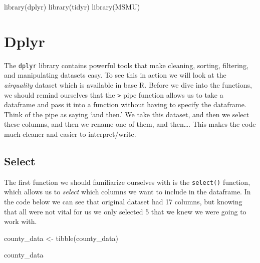 \documentclass[
  letterpaper,
  DIV=11,
  numbers=noendperiod]{scrreprt}
\newenvironment{Shaded}{\begin{snugshade}}{\end{snugshade}}
\newcommand{\FunctionTok}[1]{\textcolor[rgb]{0.28,0.35,0.67}{#1}}
\newcommand{\NormalTok}[1]{\textcolor[rgb]{0.00,0.23,0.31}{#1}}
\newcommand{\OtherTok}[1]{\textcolor[rgb]{0.00,0.23,0.31}{#1}}
\begin{document}
\begin{Shaded}
\begin{Highlighting}[]
\FunctionTok{library}\NormalTok{(dplyr)}
\FunctionTok{library}\NormalTok{(tidyr)}
\FunctionTok{library}\NormalTok{(MSMU)}
\end{Highlighting}
\end{Shaded}

\section{Dplyr}\label{dplyr}

The \texttt{dplyr} library contains powerful tools that make cleaning,
sorting, filtering, and manipulating datasets easy. To see this in
action we will look at the \emph{airquality} dataset which is available
in base R. Before we dive into the functions, we should remind ourselves
that the \texttt{\textbar{}\textgreater{}} pipe function allows us to
take a dataframe and pass it into a function without having to specify
the dataframe. Think of the pipe as saying `and then.' We take this
dataset, and then we select these columns, and then we rename one of
them, and then\ldots. This makes the code much cleaner and easier to
interpret/write.

\subsection{Select}\label{select}

The first function we should familiarize ourselves with is the
\texttt{select()} function, which allows us to \emph{select} which
columns we want to include in the dataframe. In the code below we can
see that original dataset had 17 columns, but knowing that all were not
vital for us we only selected 5 that we knew we were going to work with.

\begin{Shaded}
\begin{Highlighting}[]
\NormalTok{county\_data }\OtherTok{\textless{}{-}} \FunctionTok{tibble}\NormalTok{(county\_data)}

\NormalTok{county\_data}
\end{Highlighting}
\end{Shaded}
\end{document}
